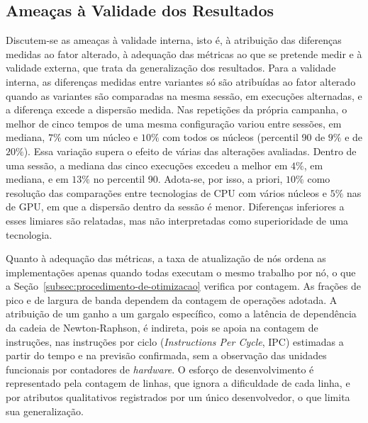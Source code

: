 
\subsection{Ameaças à Validade dos Resultados}\label{subsec:ameacas-validade}

Discutem-se as ameaças à validade interna, isto é, à atribuição das diferenças medidas ao fator alterado, à adequação das métricas ao que se pretende medir e à validade externa, que trata da generalização dos resultados.
Para a validade interna, as diferenças medidas entre variantes só são atribuídas ao fator alterado quando as variantes são comparadas na mesma sessão, em execuções alternadas, e a diferença excede a dispersão medida.
Nas repetições da própria campanha, o melhor de cinco tempos de uma mesma configuração variou entre sessões, em mediana, \(7\%\) com um núcleo e \(10\%\) com todos os núcleos (percentil 90 de \(9\%\) e de \(20\%\)).
Essa variação supera o efeito de várias das alterações avaliadas.
Dentro de uma sessão, a mediana das cinco execuções excedeu a melhor em \(4\%\), em mediana, e em \(13\%\) no percentil 90.
Adota-se, por isso, a priori, \(10\%\) como resolução das comparações entre tecnologias de CPU com vários núcleos e \(5\%\) nas de GPU, em que a dispersão dentro da sessão é menor.
Diferenças inferiores a esses limiares são relatadas, mas não interpretadas como superioridade de uma tecnologia.

Quanto à adequação das métricas, a taxa de atualização de nós ordena as implementações apenas quando todas executam o mesmo trabalho por nó, o que a Seção~\ref{subsec:procedimento-de-otimizacao} verifica por contagem.
As frações de pico e de largura de banda dependem da contagem de operações adotada.
A atribuição de um ganho a um gargalo específico, como a latência de dependência da cadeia de Newton-Raphson, é indireta, pois se apoia na contagem de instruções, nas instruções por ciclo (\textit{Instructions Per Cycle}, IPC) estimadas a partir do tempo e na previsão confirmada, sem a observação das unidades funcionais por contadores de \textit{hardware}.
O esforço de desenvolvimento é representado pela contagem de linhas, que ignora a dificuldade de cada linha, e por atributos qualitativos registrados por um único desenvolvedor, o que limita sua generalização.

